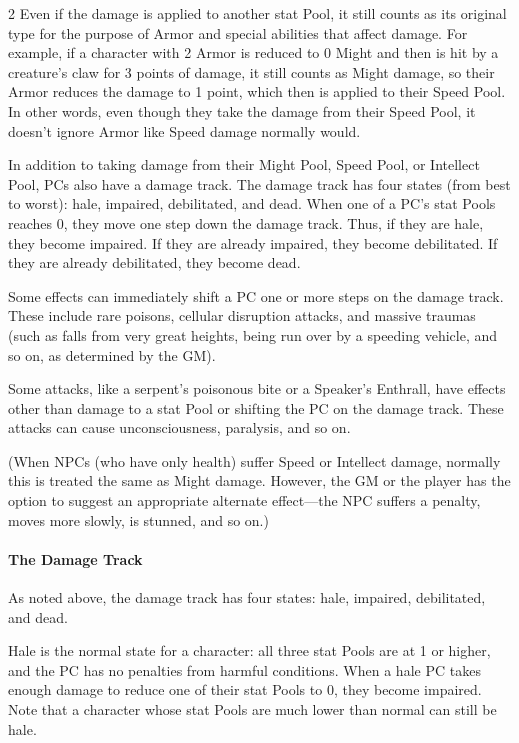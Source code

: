 \begin{multicols}{2}
Even if the damage is applied to another stat Pool, it still counts as its original type for the purpose of Armor and special abilities that affect damage. For example, if a character with 2 Armor is reduced to 0 Might and then is hit by a creature’s claw for 3 points of damage, it still counts as Might damage, so their Armor reduces the damage to 1 point, which then is applied to their Speed Pool. In other words, even though they take the damage from their Speed Pool, it doesn’t ignore Armor like Speed damage normally would.

In addition to taking damage from their Might Pool, Speed Pool, or Intellect Pool, PCs also have a damage track. The damage track has four states (from best to worst): hale, impaired, debilitated, and dead. When one of a PC’s stat Pools reaches 0, they move one step down the damage track. Thus, if they are hale, they become impaired. If they are already impaired, they become debilitated. If they are already debilitated, they become dead.

Some effects can immediately shift a PC one or more steps on the damage track. These include rare poisons, cellular disruption attacks, and massive traumas (such as falls from very great heights, being run over by a speeding vehicle, and so on, as determined by the GM).

Some attacks, like a serpent’s poisonous bite or a Speaker’s Enthrall, have effects other than damage to a stat Pool or shifting the PC on the damage track. These attacks can cause unconsciousness, paralysis, and so on.

(When NPCs (who have only health) suffer Speed or Intellect damage, normally this is treated the same as Might damage. However, the GM or the player has the option to suggest an appropriate alternate effect—the NPC suffers a penalty, moves more slowly, is stunned, and so on.)

\paragraph{The Damage Track}

As noted above, the damage track has four states: hale, impaired, debilitated, and dead.

Hale is the normal state for a character: all three stat Pools are at 1 or higher, and the PC has no penalties from harmful conditions. When a hale PC takes enough damage to reduce one of their stat Pools to 0, they become impaired. Note that a character whose stat Pools are much lower than normal can still be hale.


\end{multicols}
